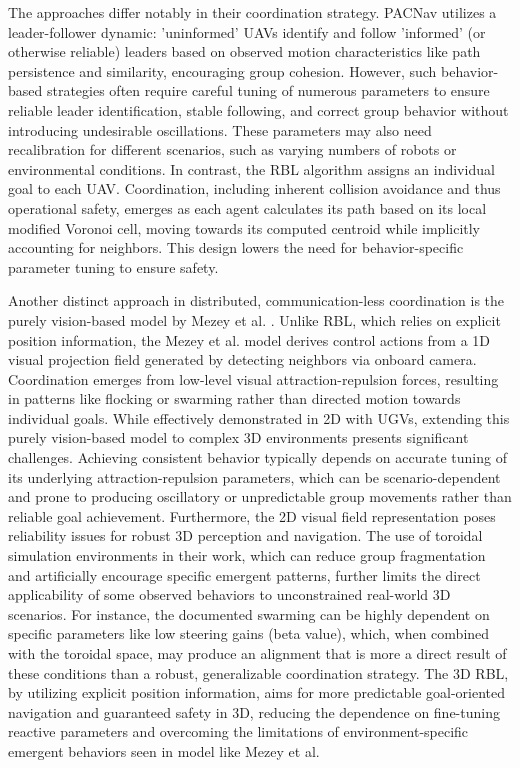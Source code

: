         The approaches differ notably in their coordination strategy. 
        PACNav utilizes a leader-follower dynamic: 'uninformed' \ac{UAV}s identify and follow 'informed' (or otherwise reliable) leaders based on observed motion characteristics like path persistence and similarity, encouraging group cohesion. 
        However, such behavior-based strategies often require careful tuning of numerous parameters to ensure reliable leader identification, stable following, and correct group behavior without introducing undesirable oscillations. 
        These parameters may also need recalibration for different scenarios, such as varying numbers of robots or environmental conditions. 
        In contrast, the \ac{RBL} algorithm assigns an individual goal to each \ac{UAV}. 
        Coordination, including inherent collision avoidance and thus operational safety, emerges as each agent calculates its path based on its local modified Voronoi cell, moving towards its computed centroid while implicitly accounting for neighbors. 
        This design lowers the need for behavior-specific parameter tuning to ensure safety.

        Another distinct approach in distributed, communication-less coordination is the purely vision-based model by Mezey et al. \cite{mezey_pure_vision}. 
        Unlike \ac{RBL}, which relies on explicit position information, the Mezey et al. model derives control actions from a 1D visual projection field generated by detecting neighbors via onboard camera. 
        Coordination emerges from low-level visual attraction-repulsion forces, resulting in patterns like flocking or swarming rather than directed motion towards individual goals. 
        While effectively demonstrated in 2D with \ac{UGV}s, extending this purely vision-based model to complex 3D environments presents significant challenges. 
        Achieving consistent behavior typically depends on accurate tuning of its underlying attraction-repulsion parameters, which can be scenario-dependent and prone to producing oscillatory or unpredictable group movements rather than reliable goal achievement. 
        Furthermore, the 2D visual field representation poses reliability issues for robust 3D perception and navigation. 
        The use of toroidal simulation environments in their work, which can reduce group fragmentation and artificially encourage specific emergent patterns, further limits the direct applicability of some observed behaviors to unconstrained real-world 3D scenarios. 
        For instance, the documented swarming can be highly dependent on specific parameters like low steering gains (beta value), which, when combined with the toroidal space, may produce an alignment that is more a direct result of these conditions than a robust, generalizable coordination strategy. 
        The 3D \ac{RBL}, by utilizing explicit position information, aims for more predictable goal-oriented navigation and guaranteed safety in 3D, reducing the dependence on fine-tuning reactive parameters and overcoming the limitations of environment-specific emergent behaviors seen in model like Mezey et al.

